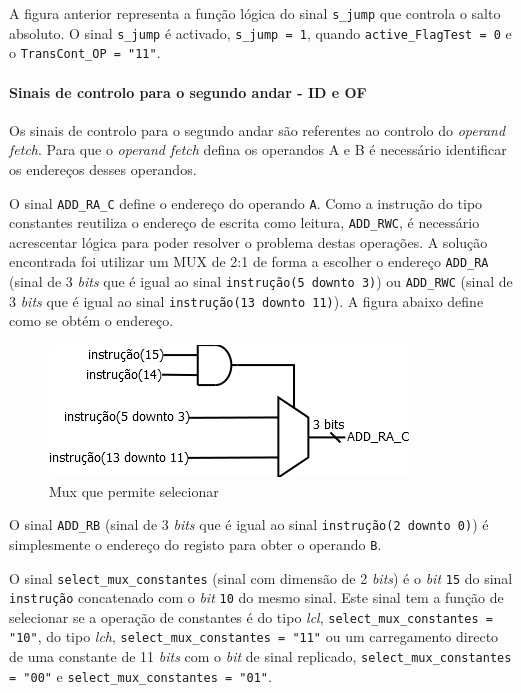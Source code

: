 \documentclass[11pt]{article}
\numberwithin{equation}{section}
\begin{document}
A figura anterior representa a função lógica do sinal \texttt{s\_jump} que controla o salto absoluto. O sinal \texttt{s\_jump} é activado, \texttt{s\_jump = 1}, quando \texttt{active\_FlagTest = 0} e o \texttt{TransCont\_OP = "11"}.
 	
\paragraph{Sinais de controlo para o segundo andar - ID e OF}

Os sinais de controlo para o segundo andar são referentes ao controlo do \textit{operand fetch}. Para que o \textit{operand fetch} defina os operandos A e B é necessário identificar os endereços desses operandos.

O sinal \texttt{ADD\_RA\_C} define o endereço do operando \texttt{A}. Como a instrução do tipo constantes reutiliza o endereço de escrita como leitura, \texttt{ADD\_RWC}, é necessário acrescentar lógica para poder resolver o problema destas operações. A solução encontrada foi utilizar um MUX de 2:1 de forma a escolher o endereço \texttt{ADD\_RA} (sinal de 3 \textit{bits} que é igual ao sinal \texttt{instrução(5 {\footnotesize downto} 3)}) ou \texttt{ADD\_RWC} (sinal de 3 \textit{bits} que é igual ao sinal \texttt{instrução(13 {\footnotesize downto} 11)}). A figura abaixo define como se obtém o endereço.

\begin{figure}[H]
	\centering
	\includegraphics[keepaspectratio=true, scale=0.6]{imagens/ADD_RA_C}
	\caption{Mux que permite selecionar}
	\vspace{-0.8em}
\end{figure}

O sinal \texttt{ADD\_RB} (sinal de 3 \textit{bits} que é igual ao sinal \texttt{instrução(2 {\footnotesize downto} 0)}) é simplesmente o endereço do registo para obter o operando \texttt{B}. 

O sinal \texttt{select\_mux\_constantes} (sinal com dimensão de 2 \textit{bits}) é o \textit{bit} \texttt{15} do sinal \texttt{instrução}  concatenado com o \textit{bit} \texttt{10} do mesmo sinal. Este sinal tem a função de selecionar se a operação de constantes é do tipo \textit{lcl}, \texttt{select\_mux\_constantes = "10"}, do tipo \textit{lch}, \texttt{select\_mux\_constantes = "11"} ou um carregamento directo de uma constante de 11 \textit{bits} com o \textit{bit} de sinal replicado, \texttt{select\_mux\_constantes = "00"} e \texttt{select\_mux\_constantes = "01"}. 
\end{document}
